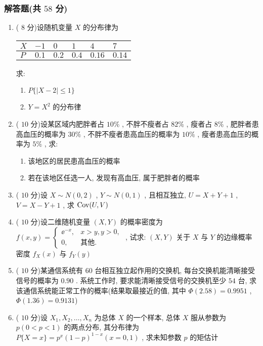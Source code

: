 \subsubsection{解答题(共 $58$ 分)}
\begin{enumerate}
	\item ( $8$ 分)设随机变量 $X$ 的分布律为
	\begin{center}
		\begin{tabularx}{0.8\textwidth}{Z|ZZZZZ}
			$X$ & $-1$ & $0$ & $1$ & $4$ & $7$\\
			\hline
			$P$ & $0.1$ & $0.2$ & $0.4$ & $0.16$ & $0.14$
		\end{tabularx}
	\end{center}
	求:
	\begin{enumerate}
		\item $P\{ |X-2|\leq 1 \}$
		\item $Y=X^2$ 的分布律
	\end{enumerate}

	\item ( $10$ 分)设某区域内肥胖者占 $10\%$ , 不胖不瘦者占 $82\%$ , 瘦者占 $8\%$ , 肥胖者患高血压的概率为 $30\%$ , 不胖不瘦者患高血压的概率为 $10\%$ , 瘦者患高血压的概率为 $5\%$ , 求:
	\begin{enumerate}
		\item 该地区的居民患高血压的概率
		\item 若在该地区任选一人, 发现有高血压, 属于肥胖者的概率
	\end{enumerate}

	\item ( $10$ 分)设 $X\sim N(0,2)$ , $Y\sim N(0,1)$ , 且相互独立, $U=X+Y+1$ , $V=X-Y+1$ , 求 $\mathrm{Cov}(U,V)$
	
	\item ( $10$ 分)设二维随机变量 $(X,Y)$ 的概率密度为 $f(x,y)=
	\begin{cases}
		\ee^{-x}, & x>y,y>0,\\
		0, & \text{其他}.
	\end{cases}
	$ , 试求: $(X,Y)$ 关于 $X$ 与 $Y$ 的边缘概率密度 $f_X(x)$ 与 $f_Y(y)$

	\item ( $10$ 分)某通信系统有 $60$ 台相互独立起作用的交换机, 每台交换机能清晰接受信号的概率为 $0.90$ . 系统工作时, 要求能清晰接受信号的交换机至少 $54$ 台, 求该通信系统能正常工作的概率(结果取最接近的值, 其中 $\varPhi(2.58)=0.9951$ , $\varPhi(1.36)=0.9131$)
	
	\item ( $10$ 分)设 $X_1,X_2,\ldots,X_n$ 为总体 $X$ 的一个样本, 总体 $X$ 服从参数为 $p(0<p<1)$ 的两点分布, 其分布律为 $P\{ X=x \}=p^x (1-p)^{1-x}(x=0,1)$ , 求未知参数 $p$ 的矩估计
\end{enumerate}